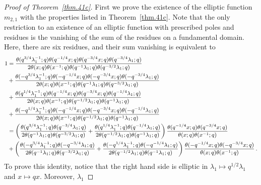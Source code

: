 \documentclass[12pt,reqno]{amsart}
\theoremstyle{definition}
\def\be{\begin{equation}}
\def\ee{\end{equation}}
\begin{document}
\begin{proof}[Proof of Theorem~\ref{thm.41c}]
  First we prove the existence of the elliptic function $m_{2,1}$
  with the properties listed in Theorem~\ref{thm.41c}. 
  Note that the only restriction to an existence of an elliptic function
  with prescribed poles and residues is the vanishing of
  the sum of the residues on a fundamental domain. Here, there are six
  residues, and their sum vanishing is equivalent to
\be
\begin{small}
\begin{aligned}
  1
  &=\frac{\theta(q^{3/4}\lambda_{1}^{-1};q)\theta(q^{-1/4}x;q)\theta(q^{-3/4}x;q)
  \theta(q^{-3/4}\lambda_{1};q)}{2\theta(x;q)\theta(x^{-1};q)
  \theta(q^{-1}\lambda_{1};q)\theta(q^{-3/2}\lambda_{1};q)}\\
  &+\frac{\theta(-q^{3/4}\lambda_{1}^{-1};q)\theta(-q^{-1/4}x;q)\theta(-q^{-3/4}x;q)
  \theta(-q^{-3/4}\lambda_{1};q)}{2\theta(x;q)\theta(x^{-1};q)
  \theta(q^{-1}\lambda_{1};q)\theta(q^{-3/2}\lambda_{1};q)}\\
  &+\frac{\theta(q^{1/4}\lambda_{1}^{-1};q)\theta(q^{-1/4}x;q)\theta(q^{-3/4}x;q)
  \theta(q^{-1/4}\lambda_{1};q)}{2\theta(x;q)\theta(x^{-1};q)
  \theta(q^{-1/2}\lambda_{1};q)\theta(q^{-1}\lambda_{1};q)}\\
  &+\frac{\theta(-q^{1/4}\lambda_{1}^{-1};q)\theta(-q^{-1/4}x;q)\theta(-q^{-3/4}x;q)
  \theta(-q^{-1/4}\lambda_{1};q)}{2\theta(x;q)\theta(x^{-1};q)
  \theta(q^{-1/2}\lambda_{1};q)\theta(q^{-1}\lambda_{1};q)}\\
  &=\left(\frac{\theta(q^{3/4}\lambda_{1}^{-1};q)
  \theta(q^{-3/4}\lambda_{1};q)}{2
  \theta(q^{-1}\lambda_{1};q)\theta(q^{-3/2}\lambda_{1};q)}
  +\frac{\theta(q^{1/4}\lambda_{1}^{-1};q)
  \theta(q^{-1/4}\lambda_{1};q)}{2
  \theta(q^{-1/2}\lambda_{1};q)\theta(q^{-1}\lambda_{1};q)}\right)
  \frac{\theta(q^{-1/4}x;q)\theta(q^{-3/4}x;q)}{\theta(x;q)\theta(x^{-1};q)}\\
  &+\left(\frac{\theta(-q^{3/4}\lambda_{1}^{-1};q)
  \theta(-q^{-3/4}\lambda_{1};q)}{2
  \theta(q^{-1}\lambda_{1};q)\theta(q^{-3/2}\lambda_{1};q)}
  +\frac{\theta(-q^{1/4}\lambda_{1}^{-1};q)
  \theta(-q^{-1/4}\lambda_{1};q)}{2
  \theta(q^{-1/2}\lambda_{1};q)\theta(q^{-1}\lambda_{1};q)}\right)
  \frac{\theta(-q^{-1/4}x;q)\theta(-q^{-3/4}x;q)}{\theta(x;q)\theta(x^{-1};q)}\,.
\end{aligned}
\end{small}
\ee
To prove this identity, notice that the right hand side is elliptic in
$\lambda_{1}\mapsto q^{1/2}\lambda_{1}$ and $x\mapsto qx$. Moreover, $\lambda_{1}$

\end{proof}
\end{document}
